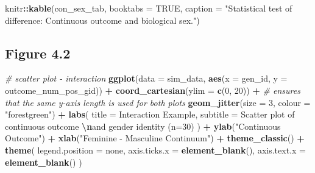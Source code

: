 \documentclass[
]{book}
\newenvironment{Shaded}{\begin{snugshade}}{\end{snugshade}}
\newcommand{\AttributeTok}[1]{\textcolor[rgb]{0.13,0.29,0.53}{#1}}
\newcommand{\CommentTok}[1]{\textcolor[rgb]{0.56,0.35,0.01}{\textit{#1}}}
\newcommand{\ConstantTok}[1]{\textcolor[rgb]{0.56,0.35,0.01}{#1}}
\newcommand{\DecValTok}[1]{\textcolor[rgb]{0.00,0.00,0.81}{#1}}
\newcommand{\FunctionTok}[1]{\textcolor[rgb]{0.13,0.29,0.53}{\textbf{#1}}}
\newcommand{\NormalTok}[1]{#1}
\newcommand{\SpecialCharTok}[1]{\textcolor[rgb]{0.81,0.36,0.00}{\textbf{#1}}}
\newcommand{\StringTok}[1]{\textcolor[rgb]{0.31,0.60,0.02}{#1}}
\begin{document}
\begin{Shaded}
\begin{Highlighting}[]
\NormalTok{knitr}\SpecialCharTok{::}\FunctionTok{kable}\NormalTok{(con\_sex\_tab, }\AttributeTok{booktabs =} \ConstantTok{TRUE}\NormalTok{, }\AttributeTok{caption =} \StringTok{"Statistical test of difference: Continuous outcome and biological sex."}\NormalTok{)}
\end{Highlighting}
\end{Shaded}

\subsection{Figure 4.2}\label{figure-4.2}

\begin{Shaded}
\begin{Highlighting}[]
\CommentTok{\# scatter plot {-} interaction}
\FunctionTok{ggplot}\NormalTok{(}\AttributeTok{data =}\NormalTok{ sim\_data, }\FunctionTok{aes}\NormalTok{(}\AttributeTok{x =}\NormalTok{ gen\_id, }\AttributeTok{y =}\NormalTok{ outcome\_num\_pos\_gid)) }\SpecialCharTok{+}
  \FunctionTok{coord\_cartesian}\NormalTok{(}\AttributeTok{ylim =} \FunctionTok{c}\NormalTok{(}\DecValTok{0}\NormalTok{, }\DecValTok{20}\NormalTok{)) }\SpecialCharTok{+} \CommentTok{\# ensures that the same y{-}axis length is used for both plots}
  \FunctionTok{geom\_jitter}\NormalTok{(}\AttributeTok{size =} \DecValTok{3}\NormalTok{, }\AttributeTok{colour =} \StringTok{"forestgreen"}\NormalTok{) }\SpecialCharTok{+}
  \FunctionTok{labs}\NormalTok{(}
    \AttributeTok{title =} \StringTok{\textquotesingle{}Interaction Example\textquotesingle{}}\NormalTok{,}
    \AttributeTok{subtitle =} \StringTok{\textquotesingle{}Scatter plot of continuous outcome }\SpecialCharTok{\textbackslash{}n}\StringTok{and gender identity (n=30)\textquotesingle{}}
\NormalTok{    ) }\SpecialCharTok{+}
  \FunctionTok{ylab}\NormalTok{(}\StringTok{"Continuous Outcome"}\NormalTok{) }\SpecialCharTok{+} \FunctionTok{xlab}\NormalTok{(}\StringTok{"Feminine {-} Masculine Continuum"}\NormalTok{) }\SpecialCharTok{+}
  \FunctionTok{theme\_classic}\NormalTok{() }\SpecialCharTok{+}
  \FunctionTok{theme}\NormalTok{(}
    \AttributeTok{legend.position =} \StringTok{\textquotesingle{}none\textquotesingle{}}\NormalTok{,}
    \AttributeTok{axis.ticks.x =} \FunctionTok{element\_blank}\NormalTok{(),}
    \AttributeTok{axis.text.x =} \FunctionTok{element\_blank}\NormalTok{()}
\NormalTok{  )}


\end{Highlighting}
\end{Shaded}
\end{document}
